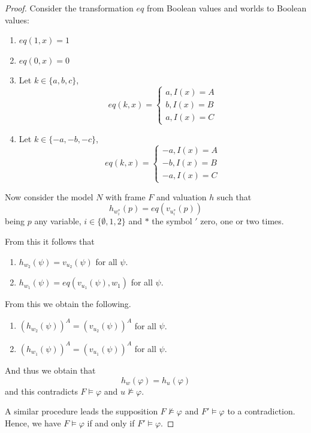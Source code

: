 \documentclass[10pt,a4paper]{amsart}
\begin{document}
\begin{proof}
    Consider the transformation $eq$ from Boolean values and worlds to Boolean values:
    \begin{enumerate}
        \item $eq(1, x) = 1$
        \item $eq(0, x) = 0$
        \item Let $k \in \{a, b, c\}$, 
        $$eq(k, x) = \begin{cases}
            a, I(x) = A\\
            b, I(x) = B\\
            a, I(x) = C
        \end{cases}$$
        \item Let $k \in \{-a, -b, -c\}$, 
        $$eq(k, x) = \begin{cases}
            -a, I(x) = A\\
            -b, I(x) = B\\
            -a, I(x) = C
        \end{cases}$$
    \end{enumerate}

    Now consider the model $N$ with frame $F$ and valuation $h$ such that 
        $$h_{w_i^*}(p) = eq(v_{u_i^*}(p))$$
    being $p$ any variable, $i \in \{\emptyset, 1, 2\}$ and $*$ the symbol $'$ zero, one or two times.

    From this it follows that 
    \begin{enumerate}
        \item $h_{w_2}(\psi) = v_{u_2}(\psi)$ for all $\psi$.
        \item $h_{w_1}(\psi) = eq(v_{u_1}(\psi), w_1)$ for all $\psi$.
    \end{enumerate}

    From this we obtain the following. 
    \begin{enumerate}
        \item $(h_{w_2}(\psi))^A = (v_{u_2}(\psi))^A$ for all $\psi$.
        \item $(h_{w_1}(\psi))^A = (v_{u_1}(\psi))^A$ for all $\psi$.
    \end{enumerate}
    And thus we obtain that 
    $$h_w(\varphi) = h_u(\varphi)$$
    and this contradicts $F \vDash \varphi$ and $u \nvDash \varphi$.

    A similar procedure leads the supposition $F \nvDash \varphi$ and $F' \vDash \varphi$ to a contradiction. Hence, we have $F \vDash \varphi$ if and only if $F' \vDash \varphi$.
\end{proof}
\end{document}
